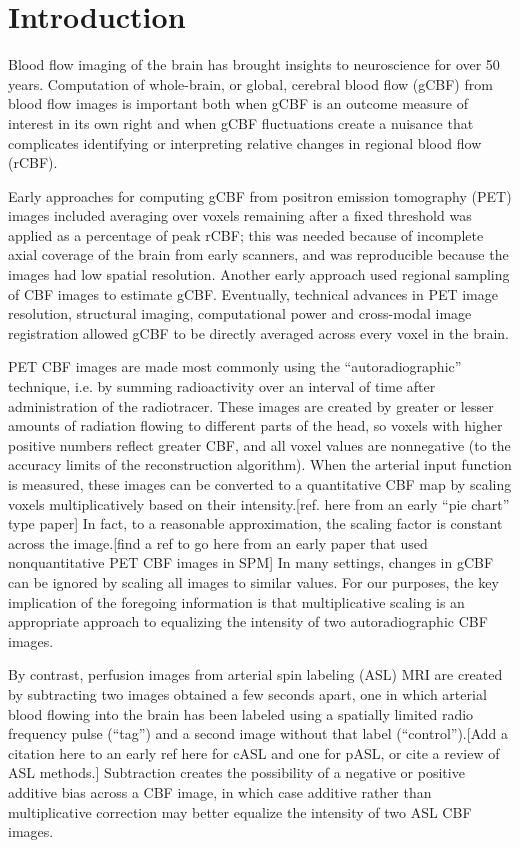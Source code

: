 \section{Introduction}
Blood flow imaging of the brain has brought insights to neuroscience for over 50 years.\cite{Taber_2005} Computation of whole-brain, or global, cerebral blood flow (gCBF) from blood flow images is important both when gCBF is an outcome measure of interest in its own right and when gCBF fluctuations create a nuisance that complicates identifying or interpreting relative changes in regional blood flow (rCBF).\cite{Small_2004} 

Early approaches for computing gCBF from positron emission tomography (PET) images included averaging over voxels remaining after a fixed threshold was applied as a percentage of peak rCBF; this was needed because of incomplete axial coverage of the brain from early scanners, and was reproducible because the images had low spatial resolution.\cite{6609680} Another early approach used regional sampling of CBF images to estimate gCBF.\cite{6971299,Perlmutter_1985} Eventually, technical advances in PET image resolution, structural imaging, computational power and cross-modal image registration allowed gCBF to be directly averaged across every voxel in the brain.

PET CBF images are made most commonly using the ``autoradiographic'' technique, i.e. by summing radioactivity over an interval of time after administration of the radiotracer. These images are created by greater or lesser amounts of radiation flowing to different parts of the head, so voxels with higher positive numbers reflect greater CBF, and all voxel values are nonnegative (to the accuracy limits of the reconstruction algorithm). When the arterial input function is measured, these images can be converted to a quantitative CBF map by scaling voxels multiplicatively based on their intensity.[ref. here from an early ``pie chart'' type paper] In fact, to a reasonable approximation, the scaling factor is constant across the image.[find a ref to go here from an early paper that used nonquantitative PET CBF images in SPM] In many settings, changes in gCBF can be ignored by scaling all images to similar values. For our purposes, the key implication of the foregoing information is that multiplicative scaling is an appropriate approach to equalizing the intensity of two autoradiographic CBF images.

By contrast, perfusion images from arterial spin labeling (ASL) MRI are created by subtracting two images obtained a few seconds apart, one in which arterial blood flowing into the brain has been labeled using a spatially limited radio frequency pulse (``tag'') and a second image without that label (``control'').[Add a citation here to an early ref here for cASL and one for pASL, or cite a review of ASL methods.] Subtraction creates the possibility of a negative or positive additive bias across a CBF image, in which case additive rather than multiplicative correction may better equalize the intensity of two ASL CBF images.

